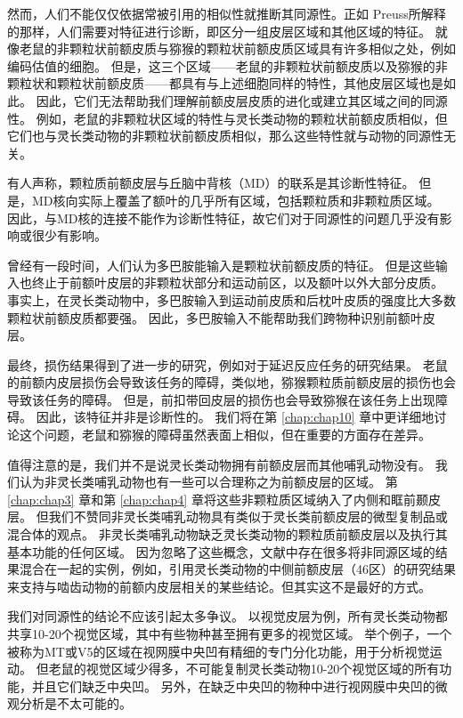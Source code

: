 然而，人们不能仅仅依据常被引用的相似性就推断其同源性。正如 Preuss\cite{preuss1995rats}所解释的那样，人们需要对特征进行诊断，即区分一组皮层区域和其他区域的特征。
就像老鼠的非颗粒状前额皮质与猕猴的颗粒状前额皮质区域具有许多相似之处，例如编码估值的细胞。
但是，这三个区域——老鼠的非颗粒状前额皮质以及猕猴的非颗粒状和颗粒状前额皮质——都具有与上述细胞同样的特性，其他皮层区域也是如此。
因此，它们无法帮助我们理解前额皮层皮质的进化或建立其区域之间的同源性。
例如，老鼠的非颗粒状区域的特性与灵长类动物的颗粒状前额皮质相似，但它们也与灵长类动物的非颗粒状前额皮质相似，那么这些特性就与动物的同源性无关。


有人声称，颗粒质前额皮层与丘脑中背核（MD）的联系是其诊断性特征\cite{je1948orbitofrontal,akert1964comparative,uylings2003rats}。
但是，MD核向实际上覆盖了额叶的几乎所有区域，包括颗粒质和非颗粒质区域。
因此，与MD核的连接不能作为诊断性特征，故它们对于同源性的问题几乎没有影响或很少有影响。


曾经有一段时间，人们认为多巴胺能输入是颗粒状前额皮质的特征\cite{divac1978converging,porrino1982brainstem}。
但是这些输入也终止于前额叶皮层的非颗粒状部分和运动前区，以及额叶以外大部分皮质。
事实上，在灵长类动物中，多巴胺输入到运动前皮质和后枕叶皮质的强度比大多数颗粒状前额皮质都要强\cite{gaspar1992topography,williams1998widespread}。
因此，多巴胺输入不能帮助我们跨物种识别前额叶皮层。


最终，损伤结果得到了进一步的研究，例如对于延迟反应任务的研究结果。
老鼠的前额内皮层损伤会导致该任务的障碍\cite{kolb1974double}，类似地，猕猴颗粒质前额皮层的损伤也会导致该任务的障碍\cite{goldman1971analysis}。
但是，前扣带回皮层的损伤也会导致猕猴在该任务上出现障碍\cite{meunier1997effects}。
因此，该特征并非是诊断性的。
我们将在第 \ref{chap:chap10} 章中更详细地讨论这个问题，老鼠和猕猴的障碍虽然表面上相似，但在重要的方面存在差异。


值得注意的是，我们并不是说灵长类动物拥有前额皮层而其他哺乳动物没有。
我们认为非灵长类哺乳动物也有一些可以合理称之为前额皮层的区域。
第 \ref{chap:chap3} 章和第 \ref{chap:chap4} 章将这些非颗粒质区域纳入了内侧和眶前颞皮层。
但我们不赞同非灵长类哺乳动物具有类似于灵长类前额皮层的微型复制品或混合体的观点。
非灵长类哺乳动物缺乏灵长类动物的颗粒质前额皮层以及执行其基本功能的任何区域。
因为忽略了这些概念，文献中存在很多将非同源区域的结果混合在一起的实例，例如，引用灵长类动物的中侧前额皮层（46区）的研究结果来支持与啮齿动物的前额内皮层相关的某些结论。但其实这不是最好的方式。


我们对同源性的结论不应该引起太多争议。
以视觉皮层为例，所有灵长类动物都共享10-20个视觉区域，其中有些物种甚至拥有更多的视觉区域\cite{kaas2020evolution}。
举个例子，一个被称为MT或V5的区域在视网膜中央凹有精细的专门分化功能，用于分析视觉运动。
但老鼠的视觉区域少得多\cite{rosa1999evolution,lyon200734}，不可能复制灵长类动物10-20个视觉区域的所有功能，并且它们缺乏中央凹。
另外，在缺乏中央凹的物种中进行视网膜中央凹的微观分析是不太可能的。


